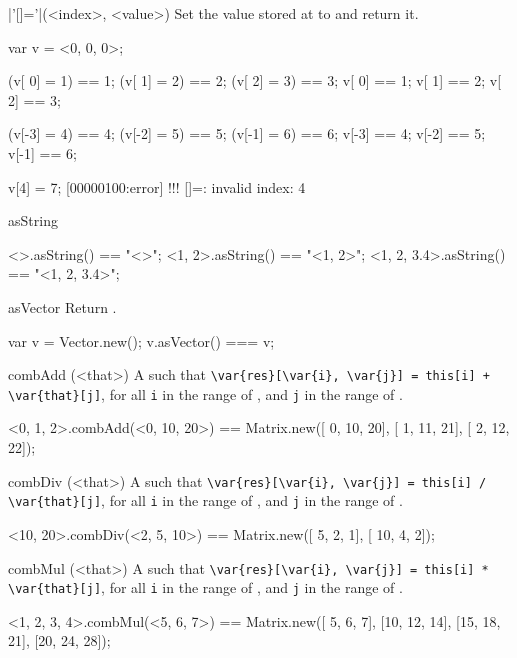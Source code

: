 \begin{urbiscriptapi}
\item|'[]='|(<index>, <value>)%
  Set the value stored at  to  and return it.
\begin{urbiassert}
var v = <0, 0, 0>;

(v[ 0] = 1) == 1; (v[ 1] = 2) == 2; (v[ 2] = 3) == 3;
 v[ 0]      == 1;  v[ 1]      == 2;  v[ 2]      == 3;

(v[-3] = 4) == 4; (v[-2] = 5) == 5; (v[-1] = 6) == 6;
 v[-3]      == 4;  v[-2]      == 5;  v[-1]      == 6;

v[4] = 7;
[00000100:error] !!! []=: invalid index: 4
\end{urbiassert}


\item[asString]%
\begin{urbiassert}
  <>.asString() == "<>";
  <1, 2>.asString() == "<1, 2>";
  <1, 2, 3.4>.asString() == "<1, 2, 3.4>";

\end{urbiassert}


\item[asVector]%
  Return \this.
\begin{urbiassert}
var v = Vector.new();
v.asVector() === v;
\end{urbiassert}


\item[combAdd](<that>)%
  A   such that
  \lstinline|\var{res}[\var{i}, \var{j}] = this[i] + \var{that}[j]|, for all
  \lstinline|i| in the range of \this, and \lstinline|j| in the range of
  \that.
\begin{urbiassert}
<0, 1, 2>.combAdd(<0, 10, 20>)
  == Matrix.new([ 0, 10, 20],
                [ 1, 11, 21],
                [ 2, 12, 22]);
\end{urbiassert}


\item[combDiv](<that>)%
  A   such that
  \lstinline|\var{res}[\var{i}, \var{j}] = this[i] / \var{that}[j]|, for all
  \lstinline|i| in the range of \this, and \lstinline|j| in the range of
  \that.
\begin{urbiassert}
<10, 20>.combDiv(<2, 5, 10>)
  == Matrix.new([  5, 2, 1],
                [ 10, 4, 2]);
\end{urbiassert}


\item[combMul](<that>)%
  A   such that
  \lstinline|\var{res}[\var{i}, \var{j}] = this[i] * \var{that}[j]|, for all
  \lstinline|i| in the range of \this, and \lstinline|j| in the range of
  \that.
\begin{urbiassert}
<1, 2, 3, 4>.combMul(<5, 6, 7>)
  == Matrix.new([ 5,  6,  7],
                [10, 12, 14],
                [15, 18, 21],
                [20, 24, 28]);
\end{urbiassert}



\end{urbiscriptapi}
